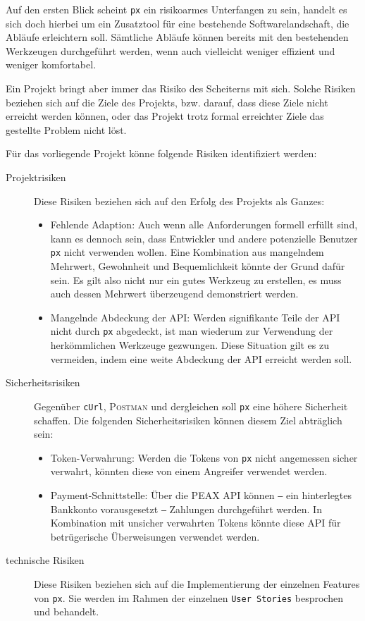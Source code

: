 Auf den ersten Blick scheint \texttt{px} ein risikoarmes Unterfangen zu sein, handelt es sich doch hierbei um ein Zusatztool für eine bestehende Softwarelandschaft, die Abläufe erleichtern soll. Sämtliche Abläufe können bereits mit den bestehenden Werkzeugen durchgeführt werden, wenn auch vielleicht weniger effizient und weniger komfortabel.

Ein Projekt bringt aber immer das Risiko des Scheiterns mit sich. Solche Risiken beziehen sich auf die Ziele des Projekts, bzw. darauf, dass diese Ziele nicht erreicht werden können, oder das Projekt trotz formal erreichter Ziele das gestellte Problem nicht löst.

Für das vorliegende Projekt könne folgende Risiken identifiziert werden:

\begin{description}
    \item[Projektrisiken] Diese Risiken beziehen sich auf den Erfolg des Projekts als Ganzes:
        \begin{itemize}
            \item Fehlende Adaption: Auch wenn alle Anforderungen formell erfüllt sind, kann es dennoch sein, dass Entwickler und andere potenzielle Benutzer \texttt{px} nicht verwenden wollen. Eine Kombination aus mangelndem Mehrwert, Gewohnheit und Bequemlichkeit könnte der Grund dafür sein. Es gilt also nicht nur ein gutes Werkzeug zu erstellen, es muss auch dessen Mehrwert überzeugend demonstriert werden.
            \item Mangelnde Abdeckung der API: Werden signifikante Teile der API nicht durch \texttt{px} abgedeckt, ist man wiederum zur Verwendung der herkömmlichen Werkzeuge gezwungen. Diese Situation gilt es zu vermeiden, indem eine weite Abdeckung der API erreicht werden soll.
        \end{itemize}
    \item[Sicherheitsrisiken] Gegenüber \texttt{cUrl}, \textsc{Postman} und dergleichen soll \texttt{px} eine höhere Sicherheit schaffen. Die folgenden Sicherheitsrisiken können diesem Ziel abträglich sein:
        \begin{itemize}
            \item Token-Verwahrung: Werden die Tokens von \texttt{px} nicht angemessen sicher verwahrt, könnten diese von einem Angreifer verwendet werden.
            \item Payment-Schnittstelle: Über die PEAX API können ‒ ein hinterlegtes Bankkonto vorausgesetzt ‒ Zahlungen durchgeführt werden. In Kombination mit unsicher verwahrten Tokens könnte diese API für betrügerische Überweisungen verwendet werden.
        \end{itemize}
    \item[technische Risiken] Diese Risiken beziehen sich auf die Implementierung der einzelnen Features von \texttt{px}. Sie werden im Rahmen der einzelnen \texttt{User Stories} besprochen und behandelt.
\end{description}
